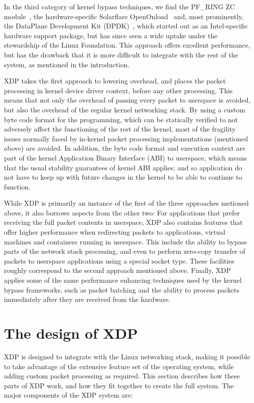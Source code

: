 \documentclass[10pt,sigconf]{acmart}
\begin{document}
In the third category of kernel bypass techniques, we find the PF\_RING ZC
module~\cite{pfringzc}, the hardware-specific Solarflare
OpenOnload~\cite{openonload} and, most prominently, the DataPlane Development
Kit (DPDK)~\cite{dpdk}, which started out as an Intel-specific hardware support
package, but has since seen a wide uptake under the stewardship of the Linux
Foundation. This approach offers excellent performance, but has the drawback
that it is more difficult to integrate with the rest of the system, as mentioned
in the introduction.

XDP takes the first approach to lowering overhead, and places the packet
processing in kernel device driver context, before any other processing. This
means that not only the overhead of passing every packet to userspace is
avoided, but also the overhead of the regular kernel networking stack. By using
a custom byte code format for the programming, which can be statically verified
to not adversely affect the functioning of the rest of the kernel, most of the
fragility issues normally faced by in-kernel packet processing implementations
(mentioned above) are avoided. In addition, the byte code format and execution
context are part of the kernel Application Binary Interface (ABI) to userspace,
which means that the usual stability guarantees of kernel ABI applies; and so
application do not have to keep up with future changes in the kernel to be able
to continue to function.

While XDP is primarily an instance of the first of the three approaches metioned
above, it also borrows aspects from the other two: For applications that prefer
receiving the full packet contents in userspace, XDP also contains features that
offer higher performance when redirecting packets to applications, virtual
machines and containers running in userspace. This include the ability to bypass
parts of the network stack processing, and even to perform zero-copy transfer of
packets to userspace applications using a special socket type. These facilities
roughly correspond to the second approach mentioned above. Finally, XDP applies
some of the same performance enhancing techniques used by the kernel bypass
frameworks, such as packet batching and the ability to process packets
immediately after they are received from the hardware.

\section{The design of XDP}
\label{sec:design}
XDP is designed to integrate with the Linux networking stack, making it possible
to take advantage of the extensive feature set of the operating system, while
adding custom packet processing as required. This section describes how these
parts of XDP work, and how they fit together to create the full system. The
major components of the XDP system are:
\end{document}
